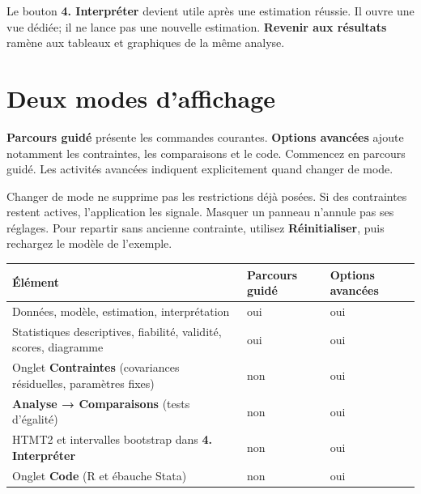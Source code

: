 \documentclass[
  french,
  11pt,
  a4paper,
  DIV=11,
  numbers=noendperiod]{scrreprt}
\newcounter{none} %
\begin{document}
Le bouton \textbf{4. Interpréter} devient utile après une estimation
réussie. Il ouvre une vue dédiée; il ne lance pas une nouvelle
estimation. \textbf{Revenir aux résultats} ramène aux tableaux et
graphiques de la même analyse.

\section{Deux modes d'affichage}\label{deux-modes-daffichage}

\textbf{Parcours guidé} présente les commandes courantes.
\textbf{Options avancées} ajoute notamment les contraintes, les
comparaisons et le code. Commencez en parcours guidé. Les activités
avancées indiquent explicitement quand changer de mode.

Changer de mode ne supprime pas les restrictions déjà posées. Si des
contraintes restent actives, l'application les signale. Masquer un
panneau n'annule pas ses réglages. Pour repartir sans ancienne
contrainte, utilisez \textbf{Réinitialiser}, puis rechargez le modèle de
l'exemple.


{\def\LTcaptype{none} %
\begin{longtable}[]{@{}
  >{\raggedright\arraybackslash}p{}
  >{\centering\arraybackslash}p{}
  >{\centering\arraybackslash}p{}@{}}
\toprule\noalign{}
\begin{minipage}[b]{\linewidth}\raggedright
Élément
\end{minipage} & \begin{minipage}[b]{\linewidth}\centering
Parcours guidé
\end{minipage} & \begin{minipage}[b]{\linewidth}\centering
Options avancées
\end{minipage} \\
\midrule\noalign{}
\endhead
\bottomrule\noalign{}
\endlastfoot
Données, modèle, estimation, interprétation & oui & oui \\
Statistiques descriptives, fiabilité, validité, scores, diagramme & oui
& oui \\
Onglet \textbf{Contraintes} (covariances résiduelles, paramètres fixes)
& non & oui \\
\textbf{Analyse → Comparaisons} (tests d'égalité) & non & oui \\
HTMT2 et intervalles bootstrap dans \textbf{4. Interpréter} & non &
oui \\
Onglet \textbf{Code} (R et ébauche Stata) & non & oui \\
\end{longtable}
}
\end{document}
